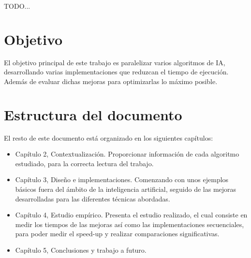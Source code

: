 		TODO...
		
	
	\newpage  %
	\section{Objetivo}
		El objetivo principal de este trabajo es paralelizar varios algoritmos de IA, desarrollando varias implementaciones que reduzcan el tiempo de ejecución. Además de evaluar dichas mejoras para optimizarlas lo máximo posible.	
		
	\newpage  %
	\section{Estructura del documento}
		El resto de este documento está organizado en los siguientes capítulos:
		
		
		\begin{itemize}
			\item Capítulo 2, Contextualización. Proporcionar información de cada algoritmo estudiado, para la correcta lectura del trabajo.
			
			\item Capítulo 3, Diseño e implementaciones. Comenzando con unos ejemplos básicos fuera del ámbito de la inteligencia artificial, seguido de las mejoras desarrolladas para las diferentes técnicas abordadas.
			
			\item Capítulo 4, Estudio empírico. Presenta el estudio realizado, el cual consiste en medir los tiempos de las mejoras así como las implementaciones secuenciales, para poder medir el speed-up y realizar comparaciones significativas.
			
			\item Capítulo 5, Conclusiones y trabajo a futuro.
		\end{itemize}
		
	
		
		
		
		
		
		
		
		
		
	